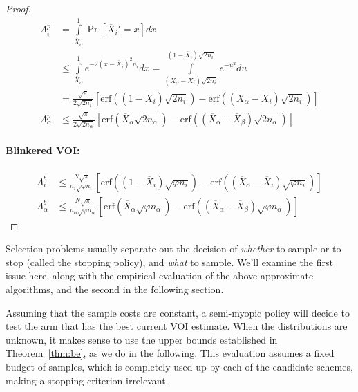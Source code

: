 \begin{proof}

\begin{align}
\Lambda_i^p&=\int\limits_{\overline X_\alpha}^1\Pr[\overline X_i'=x]dx\nonumber\\
&\le \int\limits_{\overline X_\alpha}^1e^{-2(x-\overline X_i)^2n_i}dx
=\int\limits_{(\overline X_\alpha - \overline X_i)\sqrt{2n_i}}^{(1- \overline X_i)\sqrt{2n_i}}e^{-u^2}du\nonumber\\
&=\frac {\sqrt \pi} {2 \sqrt {2n_i}}
  \left[\mathrm{erf}\left((1-\overline X_i)\sqrt {2n_i}\right)
      -\mathrm{erf}\left((\overline X_\alpha - \overline X_i)\sqrt{2n_i}\right)\right]\nonumber\\
\Lambda_\alpha^p&\le\frac {\sqrt \pi} {2 \sqrt {2n_\alpha}}
  \left[\mathrm{erf}\left(\overline X_\alpha\sqrt {2n_\alpha}\right)
      -\mathrm{erf}\left((\overline X_\alpha - \overline X_\beta)\sqrt{2n_\alpha}\right)\right]
\label{eqn:erf-perfect}
\end{align}

\paragraph{Blinkered VOI:} 

\begin{align}
\Lambda_i^b&\le\frac {N\sqrt \pi} {n_i \sqrt {\varphi n_i}}
  \left[\mathrm{erf}\left((1-\overline X_i)\sqrt {\varphi n_i}\right)
      -\mathrm{erf}\left((\overline X_\alpha - \overline X_i)\sqrt{\varphi n_i}\right)\right]\nonumber\\
\Lambda_\alpha^b&\le\frac {N\sqrt \pi} {n_\alpha \sqrt {\varphi n_\alpha}}
  \left[\mathrm{erf}\left(\overline X_\alpha\sqrt {\varphi n_\alpha}\right)
      -\mathrm{erf}\left((\overline X_\alpha - \overline X_\beta)\sqrt{\varphi n_\alpha}\right)\right]
\label{eqn:erf-blinkered}
\end{align}

\end{proof}



Selection problems usually separate out the decision of {\em whether} to
sample or to stop (called the stopping policy), and {\em what} to sample.
We'll examine the first issue here, along with the empirical evaluation 
of the above approximate algorithms, and the second in the following section.

Assuming that the sample costs are constant,
a semi-myopic policy will decide to test the arm that has the best
current VOI estimate. 
When the distributions are unknown, it makes sense
to use the upper bounds established in Theorem~\ref{thm:be}, as we do in the following.
This evaluation assumes a fixed budget of samples, which is
completely used up by each of the candidate schemes, making a stopping
criterion irrelevant.

